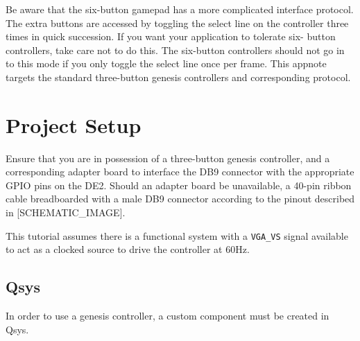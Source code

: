 \documentclass{capstonedoc}
\begin{document}
Be aware that the six-button gamepad has a more complicated interface protocol.
The extra buttons are accessed by toggling the select line on the controller
three times in quick succession. If you want your application to tolerate six-
button controllers, take care not to do this. The six-button controllers should
not go in to this mode if you only toggle the select line once per frame.
This appnote targets the standard three-button genesis controllers and 
corresponding protocol.

\section{Project Setup}
Ensure that you are in possession of a three-button genesis controller, and a 
corresponding adapter board to interface the DB9 connector with the appropriate 
GPIO pins on the DE2. Should an adapter board be unavailable, a 40-pin ribbon 
cable breadboarded with a male DB9 connector according to the pinout described 
in [SCHEMATIC\_IMAGE]. 

This tutorial assumes there is a functional system with a \texttt{VGA\_VS}
signal available to act as a clocked source to drive the controller at 60Hz. 

\subsection{Qsys}

In order to use a genesis controller, a custom component must be created in Qsys.
\end{document}
